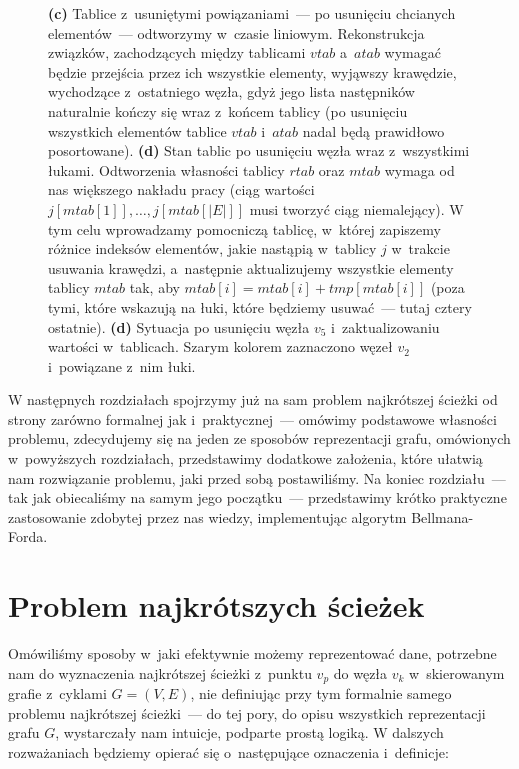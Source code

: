 \begin{figure}[!htbp]
	\caption{\textbf{(c)} Tablice z~usuniętymi powiązaniami~---  po usunięciu chcianych elementów~--- odtworzymy w~czasie liniowym. Rekonstrukcja związków, zachodzących między tablicami $vtab$ a~$atab$ wymagać będzie przejścia przez ich wszystkie elementy, wyjąwszy krawędzie, wychodzące z~ostatniego węzła, gdyż jego lista następników naturalnie kończy się wraz z~końcem tablicy (po usunięciu wszystkich elementów tablice $vtab$ i~$atab$ nadal będą prawidłowo posortowane). \textbf{(d)} Stan tablic po usunięciu węzła wraz z~wszystkimi łukami. Odtworzenia własności tablicy $rtab$ oraz $mtab$ wymaga od nas większego nakładu pracy (ciąg wartości  \\ $j \left[ mtab \left[ 1 \right] \right], \ldots, j \left[ mtab \left[ \left| E \right| \right] \right] $ musi tworzyć ciąg niemalejący). W tym celu wprowadzamy pomocniczą tablicę, w~której zapiszemy różnice indeksów elementów, jakie nastąpią w~tablicy $j$ w~trakcie usuwania krawędzi, a~następnie aktualizujemy wszystkie elementy tablicy $mtab$ tak, aby $mtab \left[i \right] = mtab \left[i \right] + tmp \left[ mtab \left[ i \right] \right]$ (poza tymi, które wskazują na łuki, które będziemy usuwać~---  tutaj cztery ostatnie). \textbf{(d)} Sytuacja po usunięciu węzła $v_{5}$ i~zaktualizowaniu wartości w~tablicach. Szarym kolorem zaznaczono węzeł $v_{2}$ i~powiązane z~nim łuki.  }\label{fig:forwardReverseStarRepresentationDeleteNode1}
\end{figure}

W następnych rozdziałach spojrzymy już na sam problem najkrótszej ścieżki od strony zarówno formalnej jak i~praktycznej~---  omówimy podstawowe własności problemu, zdecydujemy się na jeden ze sposobów reprezentacji grafu, omówionych w~powyższych rozdziałach, przedstawimy dodatkowe założenia, które ułatwią nam rozwiązanie problemu, jaki przed sobą postawiliśmy. Na koniec rozdziału~---  tak jak obiecaliśmy na samym jego początku~---  przedstawimy krótko praktyczne zastosowanie zdobytej przez nas wiedzy, implementując algorytm Bellmana-Forda.

\section{Problem najkrótszych ścieżek}
\label{sec:shortestPathProblem}

Omówiliśmy sposoby w~jaki efektywnie możemy reprezentować dane, potrzebne nam do wyznaczenia najkrótszej ścieżki z~punktu $v_{p}$ do węzła $v_{k}$ w~skierowanym grafie z~cyklami $G = \left( V, E \right)$, nie definiując przy tym formalnie samego problemu najkrótszej ścieżki~--- do tej pory, do opisu wszystkich reprezentacji grafu $G$, wystarczały nam intuicje, podparte prostą logiką. W dalszych rozważaniach będziemy opierać się o~następujące oznaczenia i~definicje:

